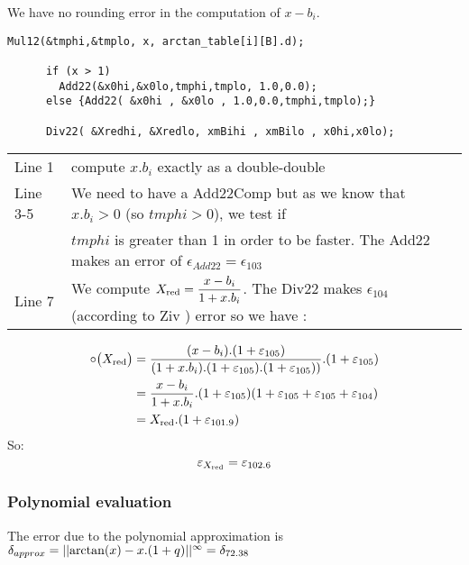 We have no rounding error in the computation of $x-b_i$.

\begin{lstlisting}[caption={Reduction part 2},firstnumber=1]
      Mul12(&tmphi,&tmplo, x, arctan_table[i][B].d);

      if (x > 1)
        Add22(&x0hi,&x0lo,tmphi,tmplo, 1.0,0.0);
      else {Add22( &x0hi , &x0lo , 1.0,0.0,tmphi,tmplo);}

      Div22( &Xredhi, &Xredlo, xmBihi , xmBilo , x0hi,x0lo);
\end{lstlisting}

\begin{tabular}{ll}
Line 1 & compute $x.b_i$ exactly as a double-double\\
Line 3-5 & We need to have a Add22Comp but as we know that $x.b_i > 0$ (so
$tmphi>0$), we test if\\& $tmphi$ is greater than 1 in order to be
faster. The Add22 makes an error of $\epsilon_{Add22}=\epsilon_{103}$\\
Line 7 & We compute $X_{\mathrm{red}} = \dfrac{x-b_i}{1+x.b_i}$. The Div22 makes $\epsilon_{104}$ (according to Ziv \cite{Ziv91}) error so we have :
\end{tabular}
\bigskip

\begin{equation}
\begin{split}
   \circ\big(X_{\mathrm{red}}\big) & = \frac{(x-b_i).(1+\varepsilon_{105})}{(1+x.b_i).(1+\varepsilon_{105})
          .(1+\varepsilon_{105}) )}.(1+\varepsilon_{105}) \\
         & =
          \frac{x-b_i}{1+x.b_i}.(1+\varepsilon_{105})(1+\varepsilon_{105}+\varepsilon_{105}+\varepsilon_{104})\\
         & = X_{\mathrm{red}} . (1+\varepsilon_{101.9})\nonumber
\end{split}
\end{equation}
So: 
\begin{equation}
\varepsilon_{X_{\mathrm{red}}} = \varepsilon_{102.6} \label{eps:equation}
\end{equation}



\subsubsection{Polynomial evaluation}

The error due to the polynomial approximation is $\delta_{approx} =
||{ \arctan(x) - x.(1+q)}||^{\infty}= \delta_{72.38}$ 

